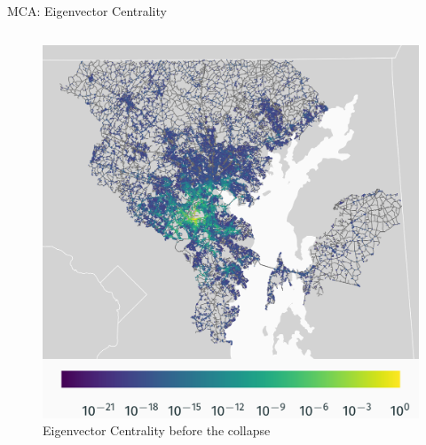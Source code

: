 \documentclass{beamer}
\numberwithin{figure}{section} %
\numberwithin{table}{section} %
\begin{document}
\begin{frame}{MCA: Eigenvector Centrality}
    \begin{columns}
        \begin{column}{0.33\textwidth}
            \begin{figure}
                \centering
                \includegraphics[width=\textwidth]{maps/eigenvector_w_bridge.png}
                {\scriptsize Eigenvector Centrality before the collapse}
            \end{figure}
        \end{column}


\end{columns}
\end{frame}
\end{document}
